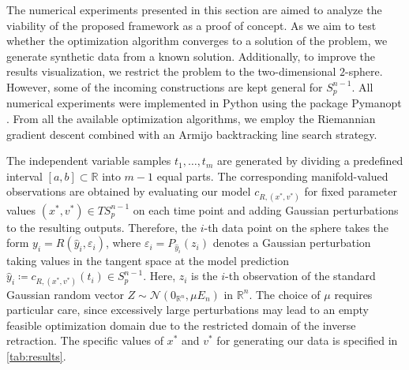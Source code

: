 \documentclass[11pt,a4paper]{article}
\theoremstyle{plain}
\theoremstyle{definition}
\newcommand{\RR}{\mathbb{R}}
\begin{document}
The numerical experiments presented in this section are aimed to analyze the viability of the proposed framework as a proof of concept. As we aim to test whether the optimization algorithm converges to a solution of the problem, we generate synthetic data from a known solution. Additionally, to improve the results visualization, we restrict the problem to the two-dimensional $2$-sphere. However, some of the incoming constructions are kept general for $S_p^{n-1}$. All numerical experiments were implemented in Python using the package Pymanopt \cite{townsend2016}. From all the available optimization algorithms, we employ the Riemannian gradient descent combined with an Armijo backtracking line search strategy.

The independent variable samples $t_1, \ldots, t_m$ are generated by dividing a predefined interval $[a, b]\subset \RR$ into $m-1$ equal parts. The corresponding manifold-valued observations are obtained by evaluating our model $c_{R, (x^*, v^*)}$ for fixed parameter values $(x^*, v^*)\in TS_p^{n-1}$ on each time point and adding Gaussian perturbations to the resulting outputs. Therefore, the $i$-th data point on the sphere takes the form $y_i = R\left(\hat{y}_i, \varepsilon_i\right)$, where $\varepsilon_i = P_{\hat{y}_i}(z_i)$ denotes a Gaussian perturbation taking values in the tangent space at the model prediction  $\hat{y}_i\coloneqq c_{R, (x^*, v^*)}(t_i)\in S_p^{n-1}$. Here, $z_i$ is the $i$-th observation of the standard Gaussian random vector $Z \sim \mathcal{N}(0_{\RR^n}, \mu E_n)$ in $\RR^n$. The choice of $\mu$ requires particular care, since excessively large perturbations may lead to an empty feasible optimization domain due to the restricted domain of the inverse retraction. The specific values of $x^*$ and $v^*$ for generating our data is specified in \cref{tab:results}.
\end{document}
